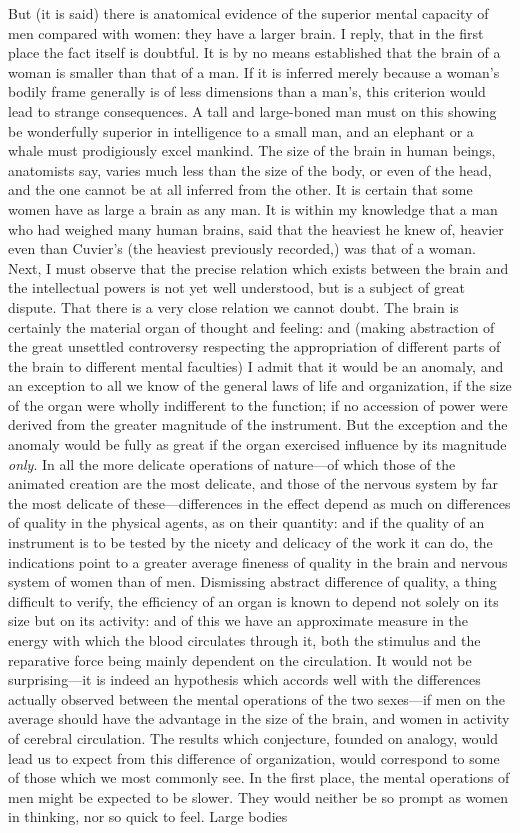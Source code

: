 \documentclass[12pt]{report}
\begin{document}
But (it is said) there is anatomical evidence of the superior mental capacity of men compared with women: they have a larger brain. I reply, that in the first place the fact itself is doubtful. It is by no means established that the brain of a woman is smaller than that of a man. If it is inferred merely because a woman's bodily frame generally is of less dimensions than a man's, this criterion would lead to strange consequences. A tall and large-boned man must on this showing be wonderfully superior in intelligence to a small man, and an elephant or a whale must prodigiously excel mankind. The size of the brain in human beings, anatomists say, varies much less than the size of the body, or even of the head, and the one cannot be at all inferred from the other. It is certain that some women have as large a brain as any man. It is within my knowledge that a man who had weighed many human brains, said that the heaviest he knew of, heavier even than Cuvier's (the heaviest previously recorded,) was that of a woman. Next, I must observe that the precise relation which exists between the brain and the intellectual powers is not yet well understood, but is a subject of great dispute. That there is a very close relation we cannot doubt. The brain is certainly the material organ of thought and feeling: and (making abstraction of the great unsettled controversy respecting the appropriation of different parts of the brain to different mental faculties) I admit that it would be an anomaly, and an exception to all we know of the general laws of life and organization, if the size of the organ were wholly indifferent to the function; if no accession of power were derived from the greater magnitude of the instrument. But the exception and the anomaly would be fully as great if the organ exercised influence by its magnitude \emph{only}. In all the more delicate operations of nature—of which those of the animated creation are the most delicate, and those of the nervous system by far the most delicate of these—differences in the effect depend as much on differences of quality in the physical agents, as on their quantity: and if the quality of an instrument is to be tested by the nicety and delicacy of the work it can do, the indications point to a greater average fineness of quality in the brain and nervous system of women than of men. Dismissing abstract difference of quality, a thing difficult to verify, the efficiency of an organ is known to depend not solely on its size but on its activity: and of this we have an approximate measure in the energy with which the blood circulates through it, both the stimulus and the reparative force being mainly dependent on the circulation. It would not be surprising—it is indeed an hypothesis which accords well with the differences actually observed between the mental operations of the two sexes—if men on the average should have the advantage in the size of the brain, and women in activity of cerebral circulation. The results which conjecture, founded on analogy, would lead us to expect from this difference of organization, would correspond to some of those which we most commonly see. In the first place, the mental operations of men might be expected to be slower. They would neither be so prompt as women in thinking, nor so quick to feel. Large bodies 
\end{document}
